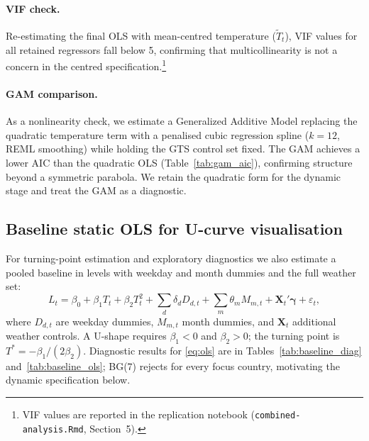 \documentclass[12pt,a4paper]{article}
\begin{document}
\paragraph{VIF check.}
Re-estimating the final OLS with mean-centred temperature ($\tilde{T}_t$), VIF values for all retained regressors fall below 5, confirming that multicollinearity is not a concern in the centred specification.\footnote{VIF values are reported in the replication notebook (\texttt{combined-analysis.Rmd}, Section~5).}

\paragraph{GAM comparison.}
As a nonlinearity check, we estimate a Generalized Additive Model replacing the quadratic temperature term with a penalised cubic regression spline ($k=12$, REML smoothing) while holding the GTS control set fixed. The GAM achieves a lower AIC than the quadratic OLS (Table~\ref{tab:gam_aic}), confirming structure beyond a symmetric parabola. We retain the quadratic form for the dynamic stage and treat the GAM as a diagnostic.

\begin{table}[H]
  \centering
  \caption{AIC comparison: quadratic OLS vs.\ GAM (Germany, static stage)}
  \label{tab:gam_aic}
  \small
  
\end{table}

\subsection{Baseline static OLS for U-curve visualisation}
\label{sec:baseline-ols}

For turning-point estimation and exploratory diagnostics we also estimate a pooled baseline in levels with weekday and month dummies and the full weather set:
\begin{equation}
  L_t = \beta_0 + \beta_1 T_t + \beta_2 T_t^2 + \sum_d \delta_d D_{d,t} + \sum_m \theta_m M_{m,t} + \mathbf{X}_t'\boldsymbol{\gamma} + \varepsilon_t,
  \label{eq:ols}
\end{equation}
where $D_{d,t}$ are weekday dummies, $M_{m,t}$ month dummies, and $\mathbf{X}_t$ additional weather controls. A U-shape requires $\beta_1 < 0$ and $\beta_2 > 0$; the turning point is $T^* = -\beta_1 / (2\beta_2)$. Diagnostic results for \eqref{eq:ols} are in Tables~\ref{tab:baseline_diag} and~\ref{tab:baseline_ols}; BG(7) rejects for every focus country, motivating the dynamic specification below.
\end{document}
